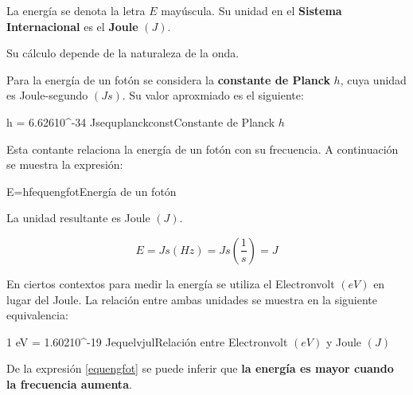 La energía se denota la letra $E$ mayúscula. Su unidad en el \textbf{Sistema Internacional} es el \textbf{Joule} $(J)$.

Su cálculo depende de la naturaleza de la onda.

Para la energía de un fotón se considera la \textbf{constante de Planck} $h$, cuya unidad es Joule-segundo $(Js)$. Su valor aproxmiado es el siguiente:

\begin{listequbox}
  { h = 6.62610^{-34} Js}{equplanckconst}{Constante de Planck $h$}
\end{listequbox}

Esta contante relaciona la energía de un fotón con su frecuencia. A continuación se muestra la expresión:

\begin{listequbox}
  {E=hf}{equengfot}{Energía de un fotón}
\end{listequbox}

La unidad resultante es Joule $(J)$.

\[ E = Js(Hz) = Js\left(\dfrac{1}{s}\right) = J \]

En ciertos contextos para medir la energía se utiliza el Electronvolt $(eV)$ en lugar del Joule. La relación entre ambas unidades se muestra en la siguiente equivalencia:

\begin{listequbox}
  {1 eV = 1.60210^{-19} J}{equelvjul}{Relación entre Electronvolt $(eV)$ y Joule $(J)$}
\end{listequbox}

De la expresión \ref{equengfot} se puede inferir que \textbf{la energía es mayor cuando la frecuencia aumenta}.

